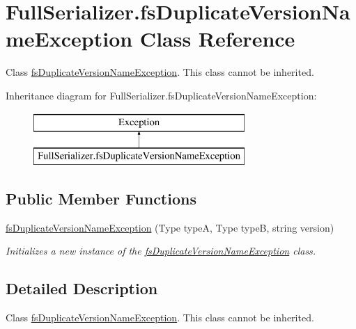 \hypertarget{class_full_serializer_1_1fs_duplicate_version_name_exception}{}\section{Full\+Serializer.\+fs\+Duplicate\+Version\+Name\+Exception Class Reference}
\label{class_full_serializer_1_1fs_duplicate_version_name_exception}


Class \hyperlink{class_full_serializer_1_1fs_duplicate_version_name_exception}{fs\+Duplicate\+Version\+Name\+Exception}. This class cannot be inherited.  


Inheritance diagram for Full\+Serializer.\+fs\+Duplicate\+Version\+Name\+Exception\+:\begin{figure}[H]
\begin{center}
\leavevmode
\includegraphics[height=2.000000cm]{class_full_serializer_1_1fs_duplicate_version_name_exception}
\end{center}
\end{figure}
\subsection*{Public Member Functions}
\begin{DoxyCompactItemize}
\item 
\hyperlink{class_full_serializer_1_1fs_duplicate_version_name_exception_a848dfbf7e1f94b5cbc894e7050541269}{fs\+Duplicate\+Version\+Name\+Exception} (Type typeA, Type typeB, string version)
\begin{DoxyCompactList}\small\item\em Initializes a new instance of the \hyperlink{class_full_serializer_1_1fs_duplicate_version_name_exception}{fs\+Duplicate\+Version\+Name\+Exception} class. \end{DoxyCompactList}\end{DoxyCompactItemize}


\subsection{Detailed Description}
Class \hyperlink{class_full_serializer_1_1fs_duplicate_version_name_exception}{fs\+Duplicate\+Version\+Name\+Exception}. This class cannot be inherited. 

